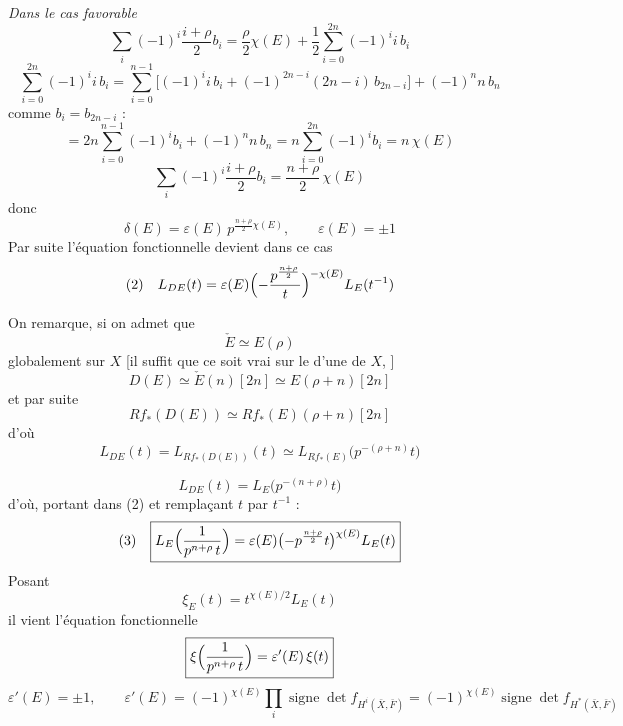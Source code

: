 \documentclass[11pt,a4paper]{article}
\begin{document}
\emph{Dans le cas favorable}
\[
  \sum_i (-1)^i \frac{i + \rho}{2} b_i
  = \frac{\rho}{2}\chi(E) + \frac{1}{2}\sum_{i=0}^{2n} (-1)^i i\, b_i
\]
\[
  \sum_{i=0}^{2n}(-1)^i i\, b_i
  = \sum_{i=0}^{n-1}\bigl[(-1)^i i\, b_i + (-1)^{2n-i}(2n-i)\, b_{2n-i}\bigr]
    + (-1)^n n\, b_n
\]
comme $b_i = b_{2n-i}$ :
\[
  = 2n\sum_{i=0}^{n-1} (-1)^i b_i + (-1)^n n\, b_n
  = n \sum_{i=0}^{2n} (-1)^i b_i = n\,\chi(E)
\]
\[
  \sum_i (-1)^i \frac{i + \rho}{2} b_i = \frac{n + \rho}{2}\,\chi(E)
\]
donc
\[
  \delta(E) = \varepsilon(E)\, p^{\frac{n+\rho}{2}\chi(E)} ,
  \qquad \varepsilon(E) = \pm 1
\]
Par suite l'équation fonctionnelle devient dans ce cas
\[
  (2)\quad
  L_{DE}(t) = \varepsilon(E)\Bigl(-\frac{p^{\frac{n+\rho}{2}}}{t}\Bigr)^{-\chi(E)} L_E(t^{-1})
\]

On remarque, si on admet que
\[
  \check E \simeq E(\rho)
\]
globalement sur $X$ \struck{\ill{}}
[il suffit que ce soit vrai sur le  d'une
\ill{} de $X$, \ill{} \ill{} \ill{}]
\[
  D(E) \simeq \check E(n)[2n] \simeq E(\rho + n)[2n]
\]
et par suite 
\[
  R f_{*}(D(E)) \simeq R f_{*}(E)(\rho + n)[2n]
\]
d'où
\[
  L_{DE}(t) = L_{Rf_{*}(D(E))}(t) \simeq L_{Rf_{*}(E)}\bigl(p^{-(\rho+n)} t\bigr)
\]

\[
  L_{DE}(t) = L_E\bigl(p^{-(n+\rho)} t\bigr)
\]
d'où, portant dans (2) et remplaçant $t$ par $t^{-1}$ :
\[
  (3)\quad
  \boxed{L_E\Bigl(\frac{1}{p^{n+\rho}\, t}\Bigr)
    = \varepsilon(E)\bigl(-p^{\frac{n+\rho}{2}} t\bigr)^{\chi(E)} L_E(t)}
\]
Posant
\[
  \boxed{\xi_E(t) = t^{\chi(E)/2} L_E(t)}
\]
il vient l'équation fonctionnelle
\[
  \boxed{\xi\Bigl(\frac{1}{p^{n+\rho}\, t}\Bigr) = \varepsilon'(E)\, \xi(t)}
\]
\[
  \varepsilon'(E) = \pm 1 , \qquad
  \varepsilon'(E) = (-1)^{\chi(E)} \prod_i \operatorname{signe} \det f_{H^i(\bar X, \bar F)}
  = (-1)^{\chi(E)} \operatorname{signe} \det f_{H^{*}(\bar X, \bar F)}
\]
\end{document}
